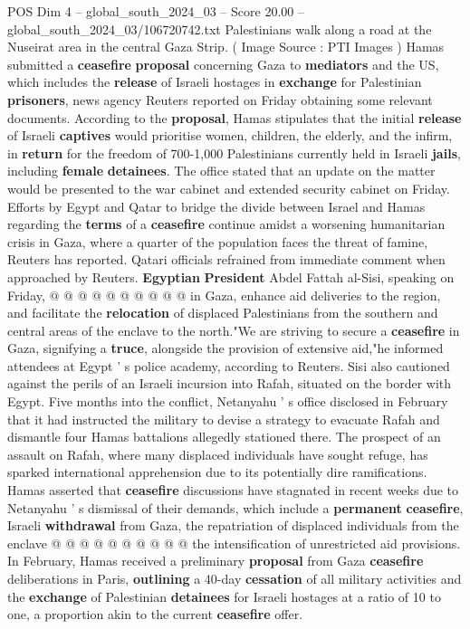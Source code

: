 \begin{textsample}{POS Dim 4 – global\_south\_2024\_03 – Score 20.00 – global\_south\_2024\_03/106720742.txt}  \label{ex:f4_pos_106}
Palestinians walk along a road at the Nuseirat area in the central Gaza Strip. ( Image Source : PTI Images ) Hamas submitted a \textbf{ceasefire} \textbf{proposal} concerning Gaza to \textbf{mediators} and the US, which includes the \textbf{release} of Israeli hostages in \textbf{exchange} for Palestinian \textbf{prisoners}, news agency Reuters reported on Friday obtaining some relevant documents.
According to the \textbf{proposal}, Hamas stipulates that the initial \textbf{release} of Israeli \textbf{captives} would prioritise women, children, the elderly, and the infirm, in \textbf{return} for the freedom of 700-1,000 Palestinians currently held in Israeli \textbf{jails}, including \textbf{female} \textbf{detainees}.
The office stated that an update on the matter would be presented to the war cabinet and extended security cabinet on Friday.
Efforts by Egypt and Qatar to bridge the divide between Israel and Hamas regarding the \textbf{terms} of a \textbf{ceasefire} continue amidst a worsening humanitarian crisis in Gaza, where a quarter of the population faces the threat of famine, Reuters has reported.
Qatari officials refrained from immediate comment when approached by Reuters. \textbf{Egyptian} \textbf{President} Abdel Fattah al-Sisi, speaking on Friday, @ @ @ @ @ @ @ @ @ @ in Gaza, enhance aid deliveries to the region, and facilitate the \textbf{relocation} of displaced Palestinians from the southern and central areas of the enclave to the north."We are striving to secure a \textbf{ceasefire} in Gaza, signifying a \textbf{truce}, alongside the provision of extensive aid,"he informed attendees at Egypt ' s police academy, according to Reuters.
Sisi also cautioned against the perils of an Israeli incursion into Rafah, situated on the border with Egypt.
Five months into the conflict, Netanyahu ' s office disclosed in February that it had instructed the military to devise a strategy to evacuate Rafah and dismantle four Hamas battalions allegedly stationed there.
The prospect of an assault on Rafah, where many displaced individuals have sought refuge, has sparked international apprehension due to its potentially dire ramifications.
Hamas asserted that \textbf{ceasefire} discussions have stagnated in recent weeks due to Netanyahu ' s dismissal of their demands, which include a \textbf{permanent} \textbf{ceasefire}, Israeli \textbf{withdrawal} from Gaza, the repatriation of displaced individuals from the enclave @ @ @ @ @ @ @ @ @ @ the intensification of unrestricted aid provisions.
In February, Hamas received a preliminary \textbf{proposal} from Gaza \textbf{ceasefire} deliberations in Paris, \textbf{outlining} a 40-day \textbf{cessation} of all military activities and the \textbf{exchange} of Palestinian \textbf{detainees} for Israeli hostages at a ratio of 10 to one, a proportion akin to the current \textbf{ceasefire} offer.

\end{textsample}
